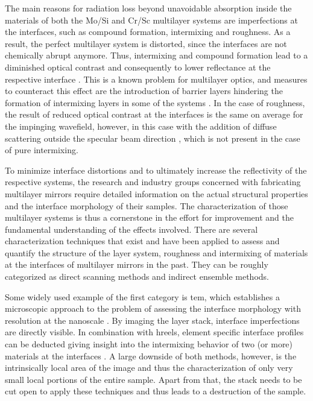 The main reasons for radiation loss beyond unavoidable absorption inside the materials of both the Mo/Si and Cr/Sc multilayer systems are imperfections at the interfaces, such as compound formation, intermixing and roughness. As a result, the perfect multilayer system is distorted, since the interfaces are not chemically abrupt anymore. Thus, intermixing and compound formation lead to a diminished optical contrast and consequently to lower reflectance at the respective interface \cite{nakajima_interdiffusion_1988}. This is a known problem for multilayer optics, and measures to counteract this effect are the introduction of barrier layers hindering the formation of intermixing layers in some of the systems \cite{braun_grenzflachen-optimierte_2003,braun_mo/si_2002}. In the case of roughness, the result of reduced optical contrast at the interfaces is the same on average for the impinging wavefield, however, in this case with the addition of diffuse scattering outside the specular beam direction \cite{sinha_x-ray_1994}, which is not present in the case of pure intermixing.

To minimize interface distortions and to ultimately increase the reflectivity of the respective systems, the research and industry groups concerned with fabricating multilayer mirrors require detailed information on the actual structural properties and the interface morphology of their samples. The characterization of those multilayer systems is thus a cornerstone in the effort for improvement and the fundamental understanding of the effects involved. 
There are several characterization techniques that exist and have been applied to assess and quantify the structure of the layer system, roughness and intermixing of materials at the interfaces of multilayer mirrors in the past. They can be roughly categorized as direct scanning methods and indirect ensemble methods.

Some widely used example of the first category is \gls{tem}, which establishes a microscopic approach to the problem of assessing the interface morphology with resolution at the nanoscale \cite{stearns_thermally_1990, bajt_investigation_2001}. By imaging the layer stack, interface imperfections are directly visible. In combination with \gls{hreels}, element specific interface profiles can be deducted giving insight into the intermixing behavior of two (or more) materials at the interfaces \cite{egerton_electron_2011, prasciolu_thermal_2014}. A large downside of both methods, however, is the intrinsically local area of the image and thus the characterization of only very small local portions of the entire sample. Apart from that, the stack needs to be cut open to apply these techniques and thus leads to a destruction of the sample.

